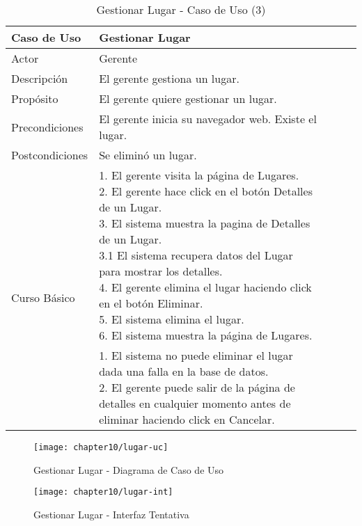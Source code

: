 \begin{table}[H]
    \begin{tabular}{@{} *5l @{}} \toprule
    \textbf{Caso de Uso} & Gestionar Lugar \\ \midrule
    Actor & Gerente \\ 
    Descripción & El gerente gestiona un lugar. \\ 
    Propósito & El gerente quiere gestionar un lugar. \\ \midrule
    Precondiciones & El gerente inicia su navegador web. Existe el lugar.\\ \midrule
    Postcondiciones & Se eliminó un lugar. \\ \midrule
    \multirow{4}{*}{Curso Básico}
        & \parbox{0.75\linewidth}{ 
                1. El gerente visita la página de Lugares. \\
                2. El gerente hace click en el botón Detalles de un Lugar. \\
                3. El sistema muestra la pagina de Detalles de un Lugar. \\
                    3.1 El sistema recupera datos del Lugar para mostrar los detalles. \\
                4. El gerente elimina el lugar haciendo click en el botón Eliminar. \\
                5. El sistema elimina el lugar.  \\
                6. El sistema muestra la página de Lugares.   
        } \\ \midrule
        & \parbox{0.75\linewidth}{ 
            1. El sistema no puede eliminar el lugar dada una falla en la base de datos. \\
            2. El gerente puede salir de la página de detalles en cualquier momento antes de eliminar haciendo click en Cancelar.
        }  \\  \bottomrule
     \hline
    \end{tabular}
        \caption{Gestionar Lugar - Caso de Uso (3)}
        \label{tab:tabcu-lugar}
\end{table}
    
    
    \begin{figure}[H]
        \centering
        \texttt{[image: chapter10/lugar-uc]}
        \caption{Gestionar Lugar - Diagrama de Caso de Uso}
        \label{fig:lugar-uc}
    \end{figure}
    
    \begin{figure}[H]
        \centering
        \texttt{[image: chapter10/lugar-int]}
        \caption{Gestionar Lugar - Interfaz Tentativa }
        \label{fig:lugar-int}
    \end{figure}
    
